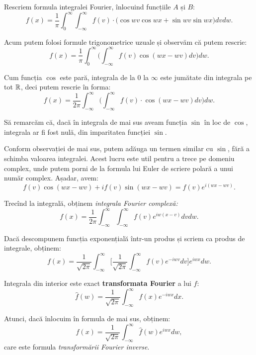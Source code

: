 Rescriem formula integralei Fourier, înlocuind funcțiile $ A $ și $ B $:
\[
  f(x) = \frac{1}{\pi} \int_0^\infty \int_{-\infty}^\infty f(v) \cdot %
  \big( \cos wv \cos wx + \sin wv \sin wx \big) dvdw.
\]

Acum putem folosi formule trigonometrice uzuale și observăm că putem rescrie:
\[
  f(x) = \frac{1}{\pi} \int_0^\infty \Big( \int_{-\infty}^\infty %
  f(v) \cos (wx - wv) dv \Big) dw.
\]

Cum funcția $ \cos $ este pară, integrala de la $ 0 $ la $ \infty $ este jumătate
din integrala pe tot $ \mathbb{R} $, deci putem rescrie în forma:
\[
  f(x) = \frac{1}{2\pi} \int_{-\infty}^\infty \Big( \int_{-\infty}^\infty f(v) \cdot %
  \cos (wx - wv) dv \Big) dw.
\]

\begin{remark}\label{rk:fourier-sin}
  Să remarcăm că, dacă în integrala de mai sus aveam funcția $ \sin $ în loc de $ \cos $,
  integrala ar fi fost nulă, din imparitatea funcției $ \sin $.
\end{remark}

Conform observației de mai sus, putem adăuga un termen similar cu $ \sin $, fără a
schimba valoarea integralei. Acest lucru este util pentru a trece pe domeniu
complex, unde putem porni de la formula lui Euler de scriere polară a unui număr
complex. Așadar, avem:
\[
  f(v) \cos (wx - wv) + if(v) \sin (wx - wv) = f(v) e^{i(wx - wv)}.
\]

Trecînd la integrală, obținem \emph{integrala Fourier complexă:}
\begin{equation}
  \label{eq:int-four-compx}
  f(x) = \frac{1}{2\pi} \int_{-\infty}^\infty \int_{-\infty}^\infty %
  f(v) e^{iw(x - v)} dvdw.
\end{equation}

Dacă descompunem funcția exponențială într-un produs și scriem ca produs de integrale,
obținem:
\[
  f(x) = \frac{1}{\sqrt{2\pi}} \int_{-\infty}^\infty \Big[ \frac{1}{\sqrt{2\pi}} %
  \int_{-\infty}^\infty f(v) e^{-iwv} dv \Big] e^{iwx} dw.
\]

Integrala din interior este exact \textbf{transformata Fourier} a lui $ f $:
\begin{equation}
  \label{eq:transf-f}
  \widehat{f}(w) = \frac{1}{\sqrt{2\pi}} \int_{-\infty}^\infty f(x) e^{-iwx} dx.
\end{equation}

Atunci, dacă înlocuim în formula de mai sus, obținem:
\begin{equation}
  \label{eq:transf-f-inv}
  f(x) = \frac{1}{\sqrt{2\pi}} \int_{-\infty}^\infty \widehat{f}(w) e^{iwx} dw,
\end{equation}
care este formula \emph{transformării Fourier inverse}.

